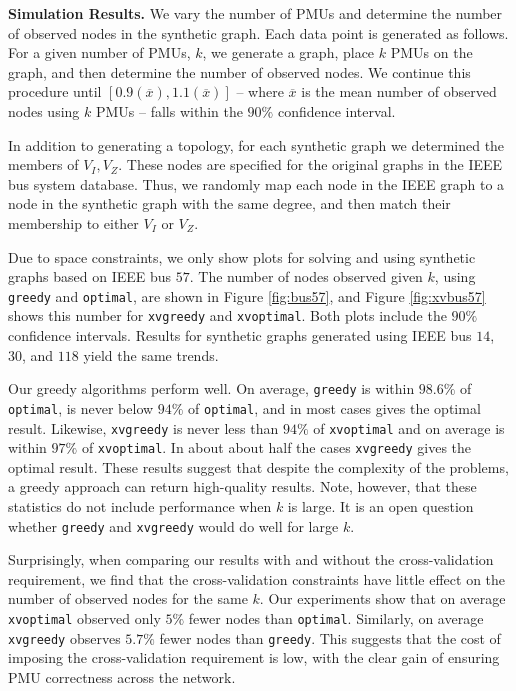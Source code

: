
\textbf{Simulation Results.}
We vary the number of PMUs and determine the number of observed nodes in the synthetic graph. 
Each data point is generated as follows. For a given number of PMUs, $k$, we generate a graph, place $k$ PMUs on the graph, and then determine the number of observed nodes. 
We continue this procedure until $[0.9(\overline{x}),1.1(\overline{x})]$ -- where $\overline{x}$ is the mean number of observed nodes using $k$ PMUs -- falls within the $90\%$ confidence interval.

In addition to generating a topology, for each synthetic graph we determined the members of $V_I, V_Z$. These nodes are specified for the original graphs in the IEEE bus system database. Thus, 
we randomly map each node in the IEEE graph to a node in the synthetic graph with the same degree, and then match their membership to either $V_I$ or $V_Z$.

Due to space constraints, we only show plots for solving \maxinc and \xvalpart using synthetic graphs based on IEEE bus $57$.  
The number of nodes observed given $k$, using {\tt greedy} and {\tt optimal}, are shown in Figure \ref{fig:bus57}, and Figure \ref{fig:xvbus57} shows this number 
for {\tt xvgreedy} and {\tt xvoptimal}.  Both plots include the $90\%$ confidence intervals. 
Results for synthetic graphs generated using IEEE bus $14$, $30$, and $118$ yield the same trends.

Our greedy algorithms perform well. On average, {\tt greedy} is within $98.6\%$ of {\tt optimal},
is never below $94\%$ of {\tt optimal}, and in most cases gives the optimal result.
Likewise, {\tt xvgreedy} is never less than $94 \%$ of {\tt xvoptimal} and on average is within $97\%$ of {\tt xvoptimal}. In about about half the cases {\tt xvgreedy} gives the optimal result.
These results suggest that despite the complexity of the problems, a greedy approach can return high-quality results. Note, however, that these statistics do not include performance when
$k$ is large.  It is an open question whether {\tt greedy} and {\tt xvgreedy} would do well for large $k$. 

Surprisingly, when comparing our results with and without the cross-validation requirement, we find that the cross-validation constraints have little effect on the number of observed nodes 
for the same $k$. Our experiments show that on average {\tt xvoptimal} observed only $5\%$ fewer nodes than {\tt optimal}.  Similarly, on average {\tt xvgreedy} observes
 $5.7\%$ fewer nodes than {\tt greedy}. This suggests that the cost of imposing the cross-validation requirement is low, with the clear gain of ensuring PMU correctness across the network.



